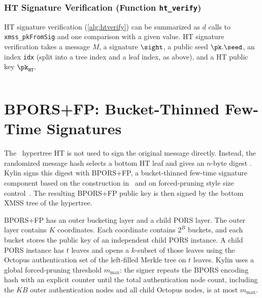 \begin{algorithm}
    \inputminted[breaklines,linenos,tabsize=2,mathescape,escapeinside=||]{C}{paper/code/ht_sign.cs}
    \caption{\texttt{ht\_sign} --- Generating an HT signature.}
    \label{alg:htsign}
\end{algorithm}

\subsubsection{HT Signature Verification (Function \texttt{ht\_verify})}

HT signature verification (\cref{alg:htverify}) can be summarized as $d$ calls to \texttt{xmss\_pkFromSig} and one comparison with a given value. HT signature verification takes a message $M$, a signature $\sight$, a public seed $\pk.\seed$, an index \texttt{idx} (split into a tree index and a leaf index, as above), and a HT public key $\pk_{\mathtt{HT}}.$

\begin{algorithm}
    \inputminted[breaklines,linenos,tabsize=2,mathescape,escapeinside=||]{C}{paper/code/ht_verify.cs}
    \caption{\texttt{ht\_verify} --- Verifying a HT signature $\bf {SIG}_{HT}$ on a message $M$ using a HT public key ${\bf PK}_{HT}$.}
    \label{alg:htverify}
\end{algorithm}
\section{BPORS+FP: Bucket-Thinned Few-Time Signatures}
\label{sec:bpors}

The \SPHINCSA\ hypertree HT is not used to sign the original message directly.
Instead, the randomized message hash selects a bottom HT leaf and gives an
$n$-byte digest \md.  Kylin signs this digest with BPORS+FP, a bucket-thinned
few-time signature component based on the construction in~\cite{bucketthinning}
and on forced-pruning style size control~\cite{EPRINT:AbrKat25}.  The resulting
BPORS+FP public key is then signed by the bottom XMSS tree of the hypertree.

BPORS+FP has an outer bucketing layer and a child PORS layer.  The outer layer
contains $K$ coordinates.  Each coordinate contains $2^B$ buckets, and each
bucket stores the public key of an independent child PORS instance.  A child
PORS instance has $t$ leaves and opens a $k$-subset of those leaves using the
Octopus authentication set of the left-filled Merkle tree on $t$ leaves.  Kylin
uses a global forced-pruning threshold $m_{\max}$: the signer repeats the
BPORS encoding hash with an explicit counter until the total authentication
node count, including the $KB$ outer authentication nodes and all child Octopus
nodes, is at most $m_{\max}$.

